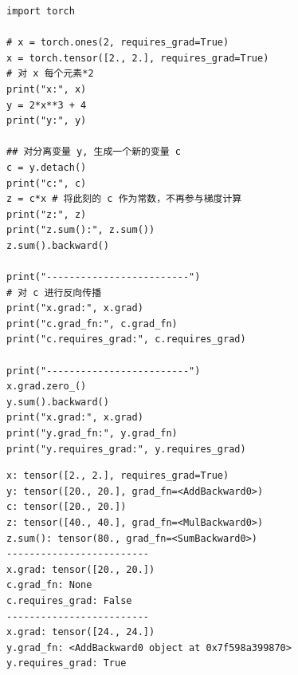 \begin{lstlisting}[style=pythonstyle]
import torch

# x = torch.ones(2, requires_grad=True)
x = torch.tensor([2., 2.], requires_grad=True)
# 对 x 每个元素*2
print("x:", x)
y = 2*x**3 + 4
print("y:", y)

## 对分离变量 y, 生成一个新的变量 c
c = y.detach()
print("c:", c)
z = c*x # 将此刻的 c 作为常数，不再参与梯度计算
print("z:", z)
print("z.sum():", z.sum())
z.sum().backward()

print("-------------------------")
# 对 c 进行反向传播
print("x.grad:", x.grad)
print("c.grad_fn:", c.grad_fn)
print("c.requires_grad:", c.requires_grad)

print("-------------------------")
x.grad.zero_()
y.sum().backward()
print("x.grad:", x.grad)
print("y.grad_fn:", y.grad_fn)
print("y.requires_grad:", y.requires_grad)
\end{lstlisting}
\begin{lstlisting}[style=demostyle,numbers=none]
x: tensor([2., 2.], requires_grad=True)
y: tensor([20., 20.], grad_fn=<AddBackward0>)
c: tensor([20., 20.])
z: tensor([40., 40.], grad_fn=<MulBackward0>)
z.sum(): tensor(80., grad_fn=<SumBackward0>)
-------------------------
x.grad: tensor([20., 20.])
c.grad_fn: None
c.requires_grad: False
-------------------------
x.grad: tensor([24., 24.])
y.grad_fn: <AddBackward0 object at 0x7f598a399870>
y.requires_grad: True
\end{lstlisting}  


